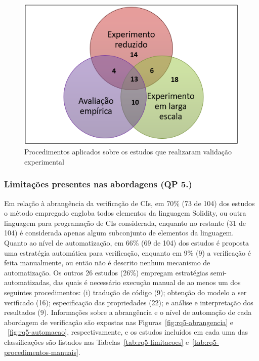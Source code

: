 \begin{figure}[!htb]
 \caption{Procedimentos aplicados sobre os estudos que realizaram validação experimental}
 \label{fig:rq4-diagrama-experimento}
 \centering
 \includegraphics[scale=0.7]{figuras/rq4-diagrama-experimento.png}
 \fdadospesquisa
\end{figure}


\subsubsection*{Limitações presentes nas abordagens (\textbf{QP 5.})}


Em relação à abrangência da verificação de CIs, em 70\% (73 de 104) dos estudos o método empregado engloba todos elementos da linguagem Solidity, ou outra linguagem para programação de CIs considerada, enquanto no restante (31 de 104) é considerada apenas algum subconjunto de elementos da linguagem. Quanto ao nível de automatização, em 66\% (69 de 104) dos estudos é proposta uma estratégia automática para verificação, enquanto em 9\% (9) a verificação é feita manualmente, ou então não é descrito nenhum mecanismo de automatização. Os outros 26 estudos (26\%) empregam estratégias semi-automatizadas, das quais é necessário execução manual de ao menos um dos seguintes procedimentos: (i) tradução de código (9); obtenção do modelo a ser verificado (16); especificação das propriedades (22); e análise e interpretação dos resultados (9). Informações sobre a abrangência e o nível de automação de cada abordagem de verificação são expostas nas Figuras~\ref{fig:rq5-abrangencia} e ~\ref{fig:rq5-automacao}, respectivamente, e os estudos incluídos em cada uma das classificações são listados nas Tabelas~\ref{tab:rq5-limitacoes} e~\ref{tab:rq5-procedimentos-manuais}. 

